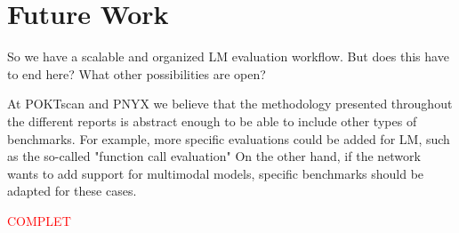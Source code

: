 \section{Future Work}\label{sec:z}

So we have a scalable and organized LM evaluation workflow. But does this have to end here? What other possibilities are open?

At POKTscan and PNYX we believe that the methodology presented throughout the different reports is abstract enough to be able to include other types of benchmarks. 
For example, more specific evaluations could be added for \gls{LM}, such as the so-called "function call evaluation" \cite{patil_gorilla_2023} 
On the other hand, if the network wants to add support for multimodal models, specific benchmarks \cite{yue_mmmu_2024} should be adapted for these cases. 

\textcolor{red}{COMPLET}